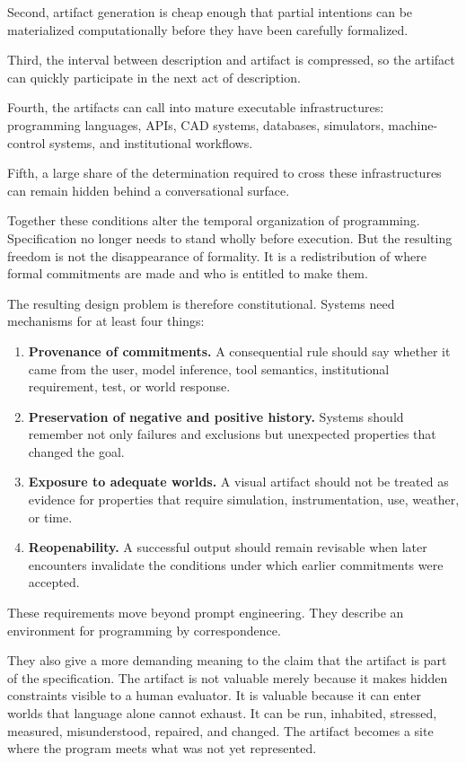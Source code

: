 \documentclass[11pt]{article}
\begin{document}
Second, artifact generation is cheap enough that partial intentions can be materialized computationally before they have been carefully formalized.

Third, the interval between description and artifact is compressed, so the artifact can quickly participate in the next act of description.

Fourth, the artifacts can call into mature executable infrastructures: programming languages, APIs, CAD systems, databases, simulators, machine-control systems, and institutional workflows.

Fifth, a large share of the determination required to cross these infrastructures can remain hidden behind a conversational surface.

Together these conditions alter the temporal organization of programming. Specification no longer needs to stand wholly before execution. But the resulting freedom is not the disappearance of formality. It is a redistribution of where formal commitments are made and who is entitled to make them.

The resulting design problem is therefore constitutional. Systems need mechanisms for at least four things:

\begin{enumerate}
\item \textbf{Provenance of commitments.} A consequential rule should say whether it came from the user, model inference, tool semantics, institutional requirement, test, or world response.
\item \textbf{Preservation of negative and positive history.} Systems should remember not only failures and exclusions but unexpected properties that changed the goal.
\item \textbf{Exposure to adequate worlds.} A visual artifact should not be treated as evidence for properties that require simulation, instrumentation, use, weather, or time.
\item \textbf{Reopenability.} A successful output should remain revisable when later encounters invalidate the conditions under which earlier commitments were accepted.
\end{enumerate}

These requirements move beyond prompt engineering. They describe an environment for programming by correspondence.

They also give a more demanding meaning to the claim that the artifact is part of the specification. The artifact is not valuable merely because it makes hidden constraints visible to a human evaluator. It is valuable because it can enter worlds that language alone cannot exhaust. It can be run, inhabited, stressed, measured, misunderstood, repaired, and changed. The artifact becomes a site where the program meets what was not yet represented.
\end{document}
